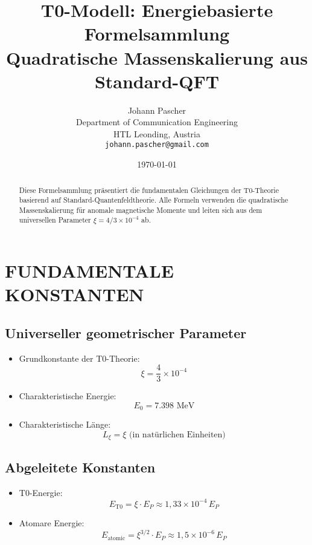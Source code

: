 \documentclass[12pt,a4paper]{article}
\begin{document}
	
	\title{T0-Modell: Energiebasierte Formelsammlung \\
		\large Quadratische Massenskalierung aus Standard-QFT}
	\author{Johann Pascher\\
		Department of Communication Engineering\\
		HTL Leonding, Austria\\
		\texttt{johann.pascher@gmail.com}}
	\date{\today}
	
	\maketitle
	
	\begin{abstract}
		Diese Formelsammlung präsentiert die fundamentalen Gleichungen der T0-Theorie basierend auf Standard-Quantenfeldtheorie. Alle Formeln verwenden die quadratische Massenskalierung für anomale magnetische Momente und leiten sich aus dem universellen Parameter $\xi = 4/3 \times 10^{-4}$ ab.
	\end{abstract}
	
	\tableofcontents
	\newpage
	
	\section{FUNDAMENTALE KONSTANTEN}
	
	\subsection{Universeller geometrischer Parameter}
	\begin{itemize}
		\item Grundkonstante der T0-Theorie:
		$$\boxed{\xi = \frac{4}{3} \times 10^{-4}}$$
		
		\item Charakteristische Energie:
		$$E_0 = 7.398 \text{ MeV}$$
		
		\item Charakteristische Länge:
		$$L_\xi = \xi \text{ (in natürlichen Einheiten)}$$
	\end{itemize}
	
	\subsection{Abgeleitete Konstanten}
	\begin{itemize}
		\item T0-Energie:
		$$E_{\text{T0}} = \xi \cdot E_P \approx 1{,}33 \times 10^{-4} \, E_P$$
		
		\item Atomare Energie:
		$$E_{\text{atomic}} = \xi^{3/2} \cdot E_P \approx 1{,}5 \times 10^{-6} \, E_P$$
	\end{itemize}
	
\end{document}
